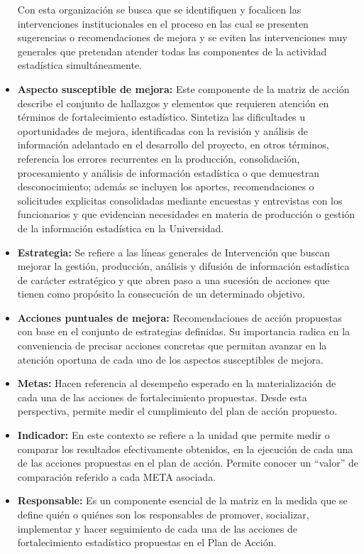 \documentclass[
]{book}
\begin{document}
\begin{itemize}
  Con esta organización se busca que se identifiquen y
  focalicen las intervenciones institucionales en el
  proceso en las cual se presenten sugerencias o
  recomendaciones de mejora y se eviten las
  intervenciones muy generales que pretendan atender
  todas las componentes de la actividad estadística
  simultáneamente.
\item
  \textbf{Aspecto susceptible de mejora:} Este componente de la matriz de acción describe el conjunto de hallazgos y elementos que requieren atención en términos de fortalecimiento estadístico. Sintetiza las dificultades u oportunidades de mejora, identificadas con la revisión y análisis de información adelantado en el desarrollo del proyecto, en otros términos, referencia los errores recurrentes en la producción, consolidación, procesamiento y análisis de información estadística o que demuestran desconocimiento; además se incluyen los aportes, recomendaciones o solicitudes explicitas consolidadas mediante encuestas y entrevistas con los funcionarios y que evidencian necesidades en materia de producción o gestión de la información estadística en la Universidad.
\item
  \textbf{Estrategia:} Se refiere a las líneas generales de Intervención que buscan mejorar la gestión, producción, análisis y difusión de información estadística de carácter estratégico y que abren paso a una sucesión de acciones que tienen como propósito la consecución de un determinado objetivo.
\item
  \textbf{Acciones puntuales de mejora:} Recomendaciones de acción propuestas con base en el conjunto de estrategias definidas. Su importancia radica en la conveniencia de precisar acciones concretas que permitan avanzar en la atención oportuna de cada uno de los aspectos susceptibles de mejora.
\item
  \textbf{Metas:} Hacen referencia al desempeño esperado en la materialización de cada una de las acciones de fortalecimiento propuestas. Desde esta perspectiva, permite medir el cumplimiento del plan de acción propuesto.
\item
  \textbf{Indicador:} En este contexto se refiere a la unidad que permite medir o comparar los resultados efectivamente obtenidos, en la ejecución de cada una de las acciones propuestas en el plan de acción. Permite conocer un ``valor'' de comparación referido a cada META asociada.
\item
  \textbf{Responsable:} Es un componente esencial de la matriz en la medida que se define quién o quiénes son los responsables de promover, socializar, implementar y hacer seguimiento de cada una de las acciones de fortalecimiento estadístico propuestas en el Plan de Acción.

\end{itemize}
\end{document}

